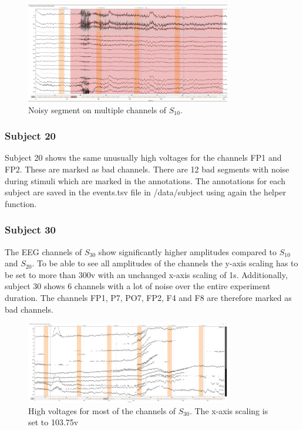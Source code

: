 \documentclass[a4paper]{article}
\begin{document}
\begin{figure}[tbh!] 
  \centering
     \includegraphics[width=0.8\textwidth]{eeg_clean_sub10.png}
  \caption{Noisy segment on multiple channels of $S_{10}$.}
  \label{fig:clean_sub10}
\end{figure}


\subsubsection{Subject 20}
Subject 20 shows the same unusually high voltages for the channels FP1 and FP2.
These are marked as bad channels.
There are 12 bad segments with noise during stimuli which are marked in the annotations.
The annotations for each subject are saved in the events.tsv file in /data/subject using again the helper function.

\subsubsection{Subject 30}
The EEG channels of $S_{30}$ show significantly higher amplitudes compared to $S_{10}$ and $S_{20}$.
To be able to see all amplitudes of the channels the y-axis scaling has to be set to more than 300\textmu v with an unchanged x-axis scaling of 1s.
Additionally, subject 30 shows 6 channels with a lot of noise over the entire experiment duration.
The channels FP1, P7, PO7, FP2, F4 and F8 are therefore marked as bad channels.
\begin{figure}[tbh!] 
  \centering
     \includegraphics[width=0.8\textwidth]{eeg_clean_sub30.png}
  \caption{High voltages for most of the channels of $S_{30}$. The x-axis scaling is set to 103.75\textmu v}
  \label{fig:clean_sub10}
\end{figure}
\end{document}
